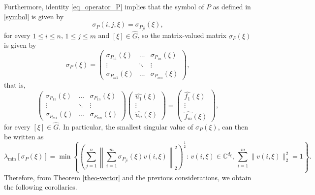 \documentclass[11pt]{amsart}
\numberwithin{theorem}{section}
\numberwithin{equation}{section}
\theoremstyle{definition}
\numberwithin{example}{section}
\theoremstyle{definition}
\theoremstyle{definition}
\begin{document}
\noindent Furthermore, identity \eqref{eq_operator_P} implies that the symbol of $P$ as defined in \eqref{symbol} is given by 
\begin{equation*}
    \sigma_P(i,j,\xi)=\sigma_{P_{ji}}(\xi),
\end{equation*}
for every $1\leq i\leq n$, $1\leq j\leq m$ and $[\xi]\in\widehat{G}$, so the matrix-valued matrix $\sigma_P(\xi)$ is given by
\begin{equation*}
    \sigma_P(\xi)=\begin{pmatrix}
        \sigma_{P_{11}}(\xi)&\dots &\sigma_{P_{1n}}(\xi)\\
        \vdots&\ddots&\vdots\\
         \sigma_{P_{m1}}(\xi)&\dots &\sigma_{P_{mn}}(\xi)
    \end{pmatrix},
\end{equation*}
that is, 
\begin{equation*}
    \begin{pmatrix}
        \sigma_{P_{11}}(\xi)&\dots &\sigma_{P_{1n}}(\xi)\\
        \vdots&\ddots&\vdots\\
         \sigma_{P_{m1}}(\xi)&\dots &\sigma_{P_{mn}}(\xi)
    \end{pmatrix}\begin{pmatrix}
        \widehat{u_1}(\xi)\\\vdots\\\widehat{u_n}(\xi)
    \end{pmatrix}=\begin{pmatrix}
        \widehat{f_1}(\xi)\\\vdots\\\widehat{f_m}(\xi)
    \end{pmatrix},
\end{equation*}
for every $[\xi]\in\widehat{G}$. In particular, the smallest singular value of $\sigma_P(\xi)$, can then be written as 
\begin{equation}\label{m_xi-for-systems}
     \lambda_{\min}[\sigma_P(\xi)]= \min\left\{\left(\sum_{j=1}^{n}\left\|\sum_{i=1}^{m}
         \sigma_{P_{ji}}(\xi)v(i,\xi)\right\|_{2}^2\right)^{\frac{1}{2}}:\,v(i,\xi)\in \mathbb{C}^{d_\xi},\,\sum_{i=1}^{m}\|v(i,\xi)\|_2^2=1\right\}.
    \end{equation}
Therefore, from Theorem \ref{theo-vector} and the previous considerations, we obtain the following corollaries.
\end{document}
